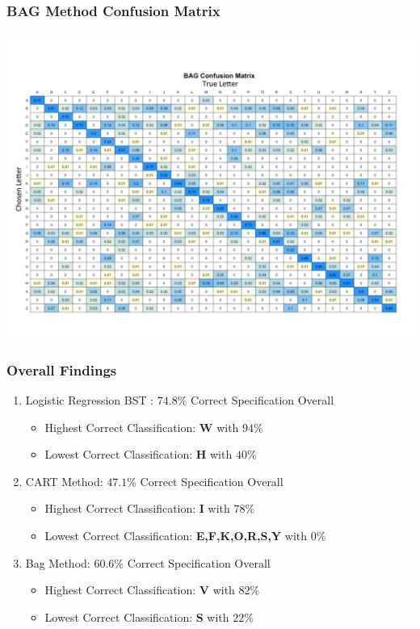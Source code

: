 \documentclass{beamer}
\begin{document}
\begin{frame}
\frametitle{BAG Method Confusion Matrix}
\begin{center} 
\includegraphics[width=.9 \textwidth]{bagConfuse}
\end{center}
\end{frame}


\begin{frame}
\frametitle{Overall Findings}
\begin{enumerate}
\item Logistic Regression BST : $74.8\%$ Correct Specification Overall
\begin{itemize}
\item Highest Correct Classification: \textbf{W} with $94\%$
\item Lowest Correct Classification: \textbf{H} with $40\%$
\end{itemize}
\item CART Method: $47.1\%$ Correct Specification Overall
\begin{itemize}
\item Highest Correct Classification: \textbf{I} with $78\%$
\item Lowest Correct Classification: \textbf{E,F,K,O,R,S,Y} with $0\%$
\end{itemize}
\item Bag Method: $60.6\%$ Correct Specification Overall
\begin{itemize}
\item Highest Correct Classification: \textbf{V} with $82\%$
\item Lowest Correct Classification: \textbf{S} with $22\%$
\end{itemize}
\end{enumerate}
\end{frame}
\end{document}
